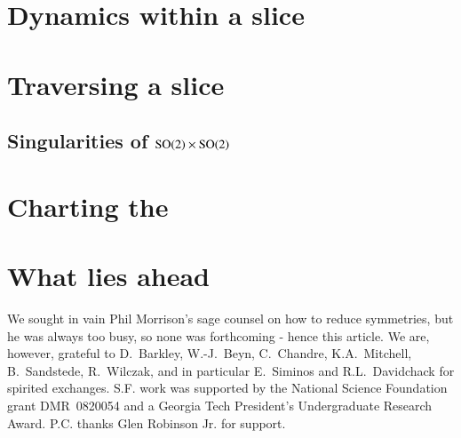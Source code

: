 \documentclass[final,3p,times]{elsarticle}	%
\begin{document}
\section{\Mframes}
    \label{sec:frame}
    

\section{Dynamics within a slice}
    \label{sec:mslices}
    

\section{Traversing a slice {\sset}}
	\label{sec:singul}
    
\subsection{Singularities of $\textrm{SO}(2) \times \textrm{SO}(2)$}
	\label{sec:singulProd}
    

\section{Charting the \reducedsp}
	\label{sec:chart}
    

\section{What lies ahead} %
    \label{sec:concl}
    

	\medskip
We sought in vain Phil Morrison's sage counsel on how
to reduce symmetries, but he was always too busy,
so none was forthcoming - hence this article.
We are, however, grateful to
D.~Barkley,
W.-J.~Beyn,
C.~Chandre,
K.A.~Mitchell,
B.~Sandstede,
R.~Wilczak,
and in particular E.~Siminos and R.L.~Davidchack
for spirited exchanges.
S.F. work was supported by the National Science Foundation
grant DMR~0820054 and a Georgia Tech President's Undergraduate
Research Award.
P.C. thanks Glen Robinson Jr. for support. 	




\ifboyscout
\newpage
\fi
\PublicPrivate{}{
    
	} %
\end{document}
